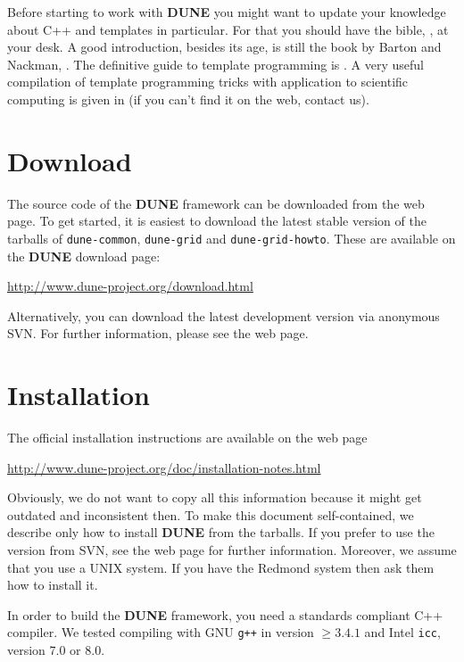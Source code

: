 \documentclass[11pt,a4paper,headinclude,footinclude,DIV16,normalheadings]{scrreprt}
\newcommand{\Dune}{{\sf\bfseries DUNE}\xspace}
\begin{document}
Before starting to work with \Dune{} you might want to update your
knowledge about C++ and templates in particular. For that you should
have the bible, \cite{Stroustrup}, at your desk. A good introduction,
besides its age, is still the book by Barton and Nackman,
\cite{BN}. The definitive guide to template programming is
\cite{VandervoordeJosuttis}. A very useful compilation of template
programming tricks with application to scientific computing is given
in \cite{Veldhui99} (if you can't find it on the web, contact us).

\section{Download}

The source code of the \Dune{} framework can be
downloaded from the web page.  To get started, it is easiest to
download the latest stable version of the tarballs of
\texttt{dune-common}, \texttt{dune-grid} and \texttt{dune-grid-howto}.
These are available on the \Dune{} download page:
%
\begin{center}
\url{http://www.dune-project.org/download.html}
\end{center}
%

Alternatively, you can download the latest development version via
anonymous SVN.  For further information, please see the web page.

\section{Installation}

The official installation instructions are available on the web page
%
\begin{center}
\url{http://www.dune-project.org/doc/installation-notes.html}
\end{center}

Obviously, we do not want to copy all this information because it might
get outdated and inconsistent then. To make this document
self-contained, we describe only how to install \Dune{} from the
tarballs.  If you prefer to use the version from SVN, see the web page
for further information.  Moreover, we assume that you use a UNIX
system. If you have the Redmond system then ask them how to install
it.

In order to build the \Dune{} framework, you need a standards
compliant C++ compiler.  We tested compiling with GNU \texttt{g++} in
version $\geq 3.4.1$ and Intel \texttt{icc}, version 7.0 or 8.0.
\end{document}
